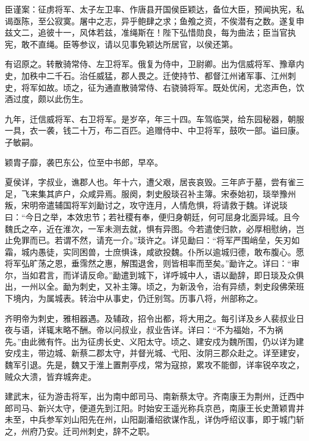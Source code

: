 \documentclass[12pt,UTF8]{ctexbook}
\begin{document}
臣谨案：征虏将军、太子左卫率、作唐县开国侯臣颖达，备位大臣，预闻执宪，私谒亟陈，至公寂寞。屠中之志，异乎鲍肆之求；鱼飧之资，不俟潜有之数。遂复申兹文二，追彼十一，风体若兹，准绳斯在！陛下弘惜勋良，每为曲法；臣当官执宪，敢不直绳。臣等参议，请以见事免颖达所居官，以侯还第。

有诏原之。转散骑常侍、左卫将军。俄复为侍中，卫尉卿。出为信威将军、豫章内史，加秩中二千石。治任威猛，郡人畏之。迁使持节、都督江州诸军事、江州刺史，将军如故。顷之，征为通直散骑常侍、右骁骑将军。既处优闲，尤恣声色，饮酒过度，颇以此伤生。

九年，迁信威将军、右卫将军。是岁卒，年三十四。车驾临哭，给东园秘器，朝服一具，衣一袭，钱二十万，布二百匹。追赠侍中、中卫将军，鼓吹一部。谥曰康。子敏嗣。

颖胄子靡，袭巴东公，位至中书郎，早卒。

夏侯详，字叔业，谯郡人也。年十六，遭父艰，居丧哀毁。三年庐于墓，尝有雀三足，飞来集其庐户，众咸异焉。服阕，刺史殷琰召补主簿。宋泰始初，琰举豫州叛，宋明帝遣辅国将军刘勔讨之，攻守连月，人情危惧，将请救于魏。详说琰曰：“今日之举，本效忠节；若社稷有奉，便归身朝廷，何可屈身北面异域。且今魏氏之卒，近在淮次，一军未测去就，惧有异图。今若遣使归款，必厚相慰纳，岂止免罪而已。若谓不然，请充一介。”琰许之。详见勔曰：“将军严围峭垒，矢刃如霜，城内愚徒，实同困兽，士庶惧诛，咸欲投魏。仆所以逾城归德，敢布腹心。愿将军弘旷荡之恩，垂霈然之惠，解围退舍，则皆相率而至矣。”勔许之。详曰：“审尔，当如君言，而详请反命。”勔遣到城下，详呼城中人，语以勔辞，即日琰及众俱出，一州以全。勔为刺史，又补主簿。顷之，为新汲令，治有异绩，刺史段佛荣班下境内，为属城表。转治中从事史，仍迁别驾。历事八将，州部称之。

齐明帝为刺史，雅相器遇。及辅政，招令出都，将大用之。每引详及乡人裴叔业日夜与语，详辄末略不酬。帝以问叔业，叔业告详。详曰：“不为福始，不为祸先。”由此微有忤。出为征虏长史、义阳太守。顷之、建安戍为魏所围，仍以详为建安戍主，带边城、新蔡二郡太守，并督光城、弋阳、汝阴三郡众赴之。详至建安，魏军引退。先是，魏又于淮上置荆亭戍，常为寇掠，累攻不能御，详率锐卒攻之，贼众大溃，皆弃城奔走。

建武末，征为游击将军，出为南中郎司马、南新蔡太守。齐南康王为荆州，迁西中郎司马、新兴太守，便道先到江阳。时始安王遥光称兵京邑，南康王长史萧颖胄并未至，中兵参军刘山阳先在州，山阳副潘绍欲谋作乱，详伪呼绍议事，即于城门斩之，州府乃安。迁司州刺史，辞不之职。
\end{document}
